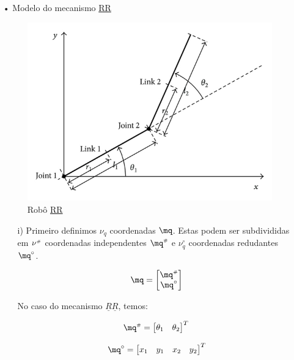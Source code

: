 \begin{itemize}
\item[•] Modelo do mecanismo \underline{R}\underline{R}

\begin{figure}[h!]
	\centering
	\includegraphics[scale=1.5]{RR.jpg}  
	\caption{Rob\^o \underline{R}\underline{R}}
	\label{fig:figura2}
\end{figure}

	\begin{itemize}
	\item[i)] Primeiro definimos $\nu_q$ coordenadas  $\mq$. Estas podem ser subdivididas em $\nu^{\scriptscriptstyle \#}$ coordenadas independentes $\mq\ssh$ e $\nu_q^\circ$ 	coordenadas redudantes $\mq^\circ$.
	
	$$
	\mq = \begin{bmatrix}
	\mq\ssh \\
	\mq^\circ
	\end{bmatrix}
	$$

	No caso do mecanismo $\underline{R}\underline{R}$, temos:

	\begin{equation}
	\mq\ssh = \begin{bmatrix}
	\theta_1 & \theta_2
	\end{bmatrix}^T \\
	\end{equation}
	
	\begin{equation}
	\mq^\circ = \begin{bmatrix}
	x_1 & y_1 & x_2 & y_2
	\end{bmatrix}^T
	\end{equation}


\end{itemize}
\end{itemize}
